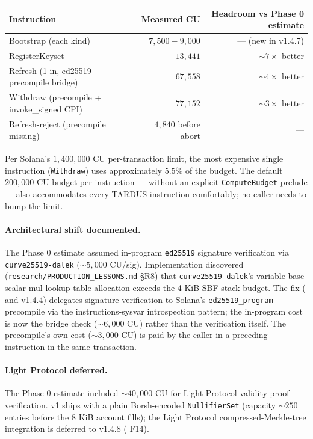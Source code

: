 \begin{center}
\begin{tabular}{lrr}
\toprule
Instruction & Measured CU & Headroom vs Phase 0 estimate \\
\midrule
Bootstrap (each kind)             & $7{,}500 - 9{,}000$ & --- (new in v1.4.7) \\
RegisterKeyset                    & $13{,}441$          & $\sim 7\times$ better \\
Refresh (1 in, ed25519 precompile bridge) & $67{,}558$  & $\sim 4\times$ better \\
Withdraw (precompile + invoke\_signed CPI) & $77{,}152$ & $\sim 3\times$ better \\
Refresh-reject (precompile missing) & $4{,}840$ before abort & --- \\
\bottomrule
\end{tabular}
\end{center}

Per Solana's $1{,}400{,}000$ CU per-transaction limit, the most
expensive single instruction (\texttt{Withdraw}) uses approximately
$5.5\%$ of the budget. The default $200{,}000$ CU budget per
instruction --- without an explicit \texttt{ComputeBudget} prelude ---
also accommodates every TARDUS instruction comfortably; no caller
needs to bump the limit.

\paragraph{Architectural shift documented.} The Phase 0 estimate
assumed in-program \texttt{ed25519} signature verification via
\texttt{curve25519-dalek} ($\sim 5{,}000$ CU/sig). Implementation
discovered (\texttt{research/PRODUCTION\_LESSONS.md} §R8) that
\texttt{curve25519-dalek}'s variable-base scalar-mul lookup-table
allocation exceeds the 4 KiB SBF stack budget. The fix
( and v1.4.4) delegates signature
verification to Solana's \texttt{ed25519\_program} precompile via the
instructions-sysvar introspection pattern; the in-program cost is now
the bridge check ($\sim 6{,}000$ CU) rather than the verification
itself. The precompile's own cost ($\sim 3{,}000$ CU) is paid by the
caller in a preceding instruction in the same transaction.

\paragraph{Light Protocol deferred.} The Phase 0 estimate included
$\sim 40{,}000$ CU for Light Protocol validity-proof verification.
v1 ships with a plain Borsh-encoded \texttt{NullifierSet} (capacity
$\sim 250$ entries before the 8 KiB account fills); the Light
Protocol compressed-Merkle-tree integration is deferred to v1.4.8
( F14).

